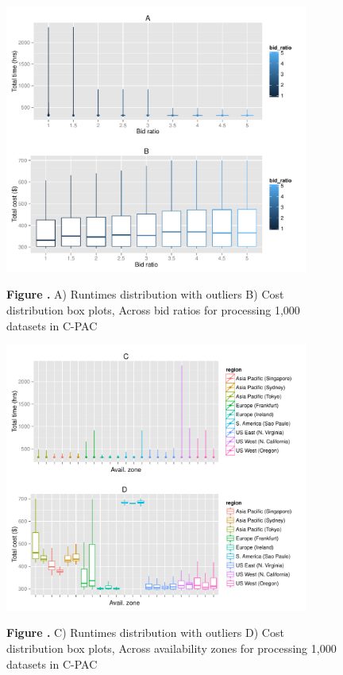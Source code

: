 \documentclass{frontiersSCNS} %
\begin{document}
\begin{figure}[!ht]
\begin{center}
\includegraphics[width=10cm]{../../spot-model/plots/cpac_violin_br.pdf}
\end{center}
 \textbf{\label{fig:br_violin} Figure .}{ A) Runtimes distribution with outliers B) Cost distribution box plots, Across bid ratios for processing 1,000 datasets in C-PAC }
\end{figure}

\begin{figure}[!ht]
\begin{center}
\includegraphics[width=10cm]{../../spot-model/plots/cpac_violin_av.pdf}
\end{center}
 \textbf{\label{fig:av_violin} Figure .}{ C) Runtimes distribution with outliers D) Cost distribution box plots, Across availability zones for processing 1,000 datasets in C-PAC }
\end{figure}
\end{document}
